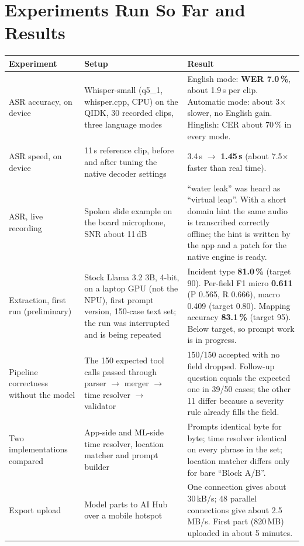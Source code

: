 \documentclass[9pt,a4paper]{extarticle}
\begin{document}
\section{Experiments Run So Far and Results}
\begin{tabularx}{\linewidth}{@{}p{3.3cm}p{5.2cm}L@{}}
\toprule
\textbf{Experiment} & \textbf{Setup} & \textbf{Result}\\
\midrule
ASR accuracy, on device & Whisper-small (q5\_1, whisper.cpp, CPU) on the QIDK, 30 recorded clips, three language modes & English mode: \textbf{WER 7.0\,\%}, about 1.9\,s per clip. Automatic mode: about 3$\times$ slower, no English gain. Hinglish: CER about 70\,\% in every mode.\\
ASR speed, on device & 11\,s reference clip, before and after tuning the native decoder settings & 3.4\,s $\rightarrow$ \textbf{1.45\,s} (about 7.5$\times$ faster than real time).\\
ASR, live recording & Spoken slide example on the board microphone, SNR about 11\,dB & ``water leak'' was heard as ``virtual leap''. With a short domain hint the same audio is transcribed correctly offline; the hint is written by the app and a patch for the native engine is ready.\\
Extraction, first run (preliminary) & Stock Llama 3.2 3B, 4-bit, on a laptop GPU (not the NPU), first prompt version, 150-case text set; the run was interrupted and is being repeated & Incident type \textbf{81.0\,\%} (target 90). Per-field F1 micro \textbf{0.611} (P 0.565, R 0.666), macro 0.409 (target 0.80). Mapping accuracy \textbf{83.1\,\%} (target 95). Below target, so prompt work is in progress.\\
Pipeline correctness without the model & The 150 expected tool calls passed through parser $\rightarrow$ merger $\rightarrow$ time resolver $\rightarrow$ validator & 150/150 accepted with no field dropped. Follow-up question equals the expected one in 39/50 cases; the other 11 differ because a severity rule already fills the field.\\
Two implementations compared & App-side and ML-side time resolver, location matcher and prompt builder & Prompts identical byte for byte; time resolver identical on every phrase in the set; location matcher differs only for bare ``Block A/B''.\\
Export upload & Model parts to AI Hub over a mobile hotspot & One connection gives about 30\,kB/s; 48 parallel connections give about 2.5\,MB/s. First part (820\,MB) uploaded in about 5 minutes.\\
\bottomrule
\end{tabularx}
\end{document}
